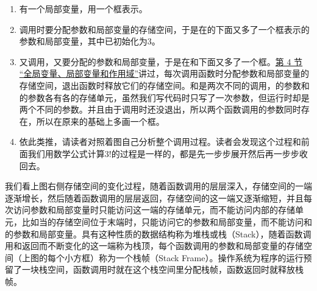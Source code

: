\begin{enumerate}

\item {}有一个局部变量，用一个框表示。

\item 调用时要分配参数和局部变量的存储空间，于是在的下面又多了一个框表示的参数和局部变量，其中已初始化为3。

\item {}又调用，又要分配的参数和局部变量，于是在和下面又多了一个框。\hyperlink{db.ch03s04.id2714471}{第 4 节 “全局变量、局部变量和作用域”}讲过，每次调用函数时分配参数和局部变量的存储空间，退出函数时释放它们的存储空间。和是两次不同的调用，的参数和的参数各有各的存储单元，虽然我们写代码时只写了一次参数，但运行时却是两个不同的参数。并且由于调用时还没退出，所以两个函数调用的参数同时存在，所以在原来的基础上多画一个框。

\item 依此类推，请读者对照着图自己分析整个调用过程。读者会发现这个过程和前面我们用数学公式计算3!的过程是一样的，都是先一步步展开然后再一步步收回去。
\end{enumerate}


我们看上图右侧存储空间的变化过程，随着函数调用的层层深入，存储空间的一端逐渐增长，然后随着函数调用的层层返回，存储空间的这一端又逐渐缩短，并且每次访问参数和局部变量时只能访问这一端的存储单元，而不能访问内部的存储单元，比如当的存储空间位于末端时，只能访问它的参数和局部变量，而不能访问和的参数和局部变量。具有这种性质的数据结构称为堆栈或栈（Stack），随着函数调用和返回而不断变化的这一端称为栈顶，每个函数调用的参数和局部变量的存储空间（上图的每个小方框）称为一个栈帧（Stack Frame）。操作系统为程序的运行预留了一块栈空间，函数调用时就在这个栈空间里分配栈帧，函数返回时就释放栈帧。



